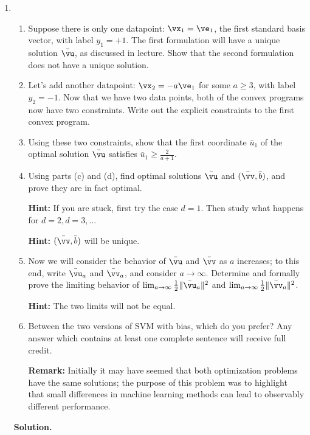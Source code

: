 \documentclass{article}
\theoremstyle{definition}
\theoremstyle{remark}
\newenvironment{Q}
{%
\clearpage
\item
}
{%
\phantom{s}%
\bigskip%
\noindent\textbf{Solution.}
}
\begin{document}
\begin{enumerate}[font={\Large\bfseries},left=0pt]
\begin{Q}
\begin{enumerate}
    \item
      Suppose there is only one datapoint: $\vx_1 = \ve_1$, the first standard basis vector, 
      with label $y_1 = +1$.
      The first formulation will have a unique solution $\bar\vu$, as discussed in lecture.
      Show that the second formulation does not have a unique solution.

    \item
      Let's add another datapoint: $\vx_2 = -a\ve_1$ for some $a\geq 3$, with label $y_2 = -1$.
      Now that we have two data points, both of the convex programs now have two constraints.
      Write out the explicit constraints to the first convex program.

    \item
      Using these two constraints, show that the first coordinate
      $\bar u_1$ of the optimal solution $\bar \vu$ satisfies $\bar u_1 \geq \frac{2}{a+1}$.

    \item
      Using parts (c) and (d), find optimal solutions $\bar\vu$ and $(\bar\vv,\bar b)$, and prove they are in fact optimal.

      \textbf{Hint:} If you are stuck, first try the case $d=1$. Then study what happens for $d=2,d=3,\ldots$

      \textbf{Hint:} $(\bar\vv,\bar b)$ will be unique.

    \item
      Now we will consider the behavior of $\bar\vu$ and $\bar\vv$ as $a$ increases;
      to this end, write $\bar\vu_a$ and $\bar\vv_a$, and consider $a\to\infty$.
      Determine and formally prove the limiting behavior of
      $\lim_{a\to\infty}\frac 1 2 \|\bar\vu_a\|^2$ and $\lim_{a\to\infty}\frac 1 2 \|\bar\vv_a\|^2$.

      \textbf{Hint:} The two limits will not be equal.

    \item
      Between the two versions of SVM with bias, which do you prefer?
      Any answer which contains at least one complete sentence will receive full credit.

      \textbf{Remark:} Initially it may have seemed that both optimization problems have
      the same solutions; the purpose of this problem was to highlight that small differences
      in machine learning methods can lead to observably different performance.
  \end{enumerate}
\end{Q}
  

\end{enumerate}
\end{document}
